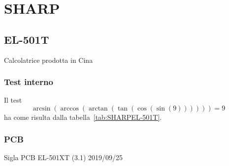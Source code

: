 \chapter{SHARP}
\section{EL-501T}
Calcolatrice prodotta in Cina
\subsection{Test interno}
Il test\[\arcsin(\arccos(\arctan(\tan(\cos(\sin(9))))))=9\] ha come risulta dalla tabella~\vref{tab:SHARPEL-501T}. 
\subsection{PCB}
Sigla PCB EL-501XT (3.1) 2019/09/25
%	
%	
